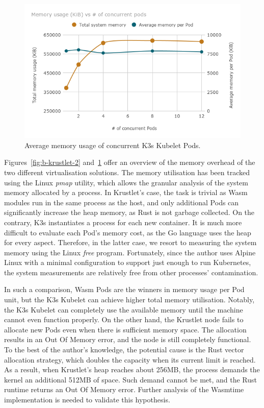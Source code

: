 \begin{figure}[ht]
\centering
\includegraphics[width=\columnwidth]{figures/b-krustlet-3}
\caption{Average memory usage of concurrent K3s Kubelet Pods.}
\label{fig:b-krustlet-3}
\end{figure}

Figures~\ref{fig:b-krustlet-2} and~\ref{fig:b-krustlet-3} offer an overview of the memory overhead of the two different virtualisation solutions. The memory utilisation has been tracked using the Linux \emph{pmap} utility, which allows the granular analysis of the system memory allocated by a process. In Krustlet's case, the task is trivial as Wasm modules run in the same process as the host, and only additional Pods can significantly increase the heap memory, as Rust is not garbage collected. On the contrary, K3s instantiates a process for each new container. It is much more difficult to evaluate each Pod's memory cost, as the Go language uses the heap for every aspect. Therefore, in the latter case, we resort to measuring the system memory using the Linux \emph{free} program. Fortunately, since the author uses Alpine Linux with a minimal configuration to support just enough to run Kubernetes, the system measurements are relatively free from other processes' contamination.

In such a comparison, Wasm Pods are the winners in memory usage per Pod unit, but the K3s Kubelet can achieve higher total memory utilisation. Notably, the K3s Kubelet can completely use the available memory until the machine cannot even function properly. On the other hand, the Krustlet node fails to allocate new Pods even when there is sufficient memory space. The allocation results in an Out Of Memory error, and the node is still completely functional. To the best of the author's knowledge, the potential cause is the Rust vector allocation strategy, which doubles the capacity when its current limit is reached. As a result, when Krustlet's heap reaches about 256MB, the process demands the kernel an additional 512MB of space. Such demand cannot be met, and the Rust runtime returns an Out Of Memory error. Further analysis of the Wasmtime implementation is needed to validate this hypothesis. 

